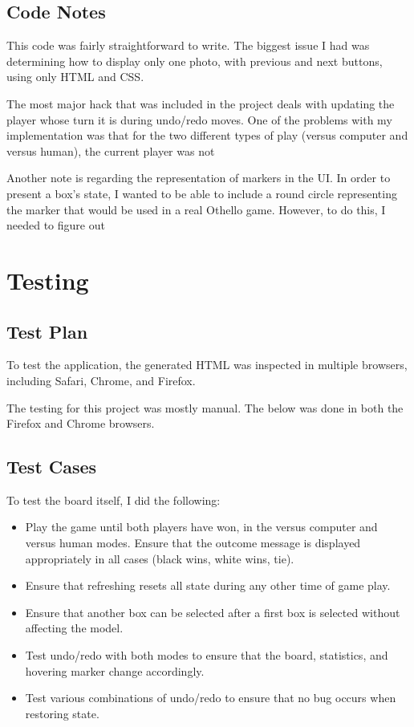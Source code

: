 \documentclass[11pt,letterpaper]{article}
\begin{document}
\subsection{Code Notes}
This code was fairly straightforward to write. The biggest issue I had was determining how to display only one photo, with previous and next buttons, using only HTML and CSS.

The most major hack that was included in the project deals with updating the player whose turn it is during undo/redo moves. One of the problems with my implementation was that for the two different types of play (versus computer and versus human), the current player was not 

Another note is regarding the representation of markers in the UI. In order to present a box's state, I wanted to be able to include a round circle representing the marker that would be used in a real Othello game. However, to do this, I needed to figure out
\section{Testing}

\subsection{Test Plan}
To test the application, the generated HTML was inspected in multiple browsers, including Safari, Chrome, and Firefox.

The testing for this project was mostly manual. The below was done in both the Firefox and Chrome browsers.

\subsection{Test Cases}
To test the board itself, I did the following:
\begin{itemize}
\item Play the game until both players have won, in the versus computer and versus human modes. Ensure that the outcome message is displayed appropriately in all cases (black wins, white wins, tie).
\item Ensure that refreshing resets all state during any other time of game play.
\item Ensure that another box can be selected after a first box is selected without affecting the model.
\item Test undo/redo with both modes to ensure that the board, statistics, and hovering marker change accordingly.
\item Test various combinations of undo/redo to ensure that no bug occurs when restoring state.
\end{itemize}
\end{document}
